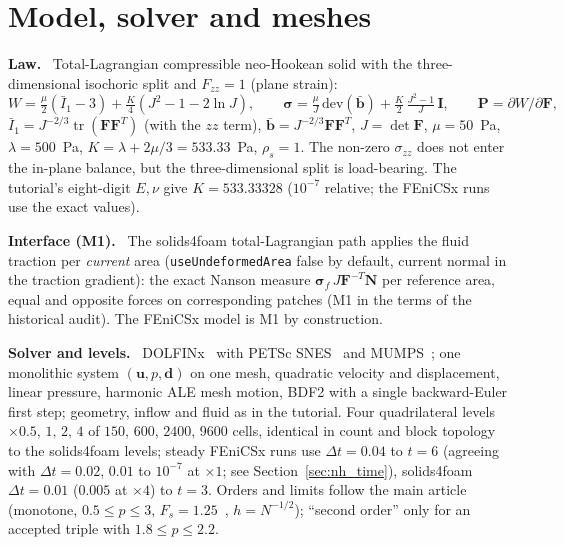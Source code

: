 \documentclass[sn-mathphys,Numbered]{sn-jnl}
\renewcommand{\paragraph}[1]{\par\vspace{0.3\baselineskip}\noindent\textbf{#1}\ }
\newcommand{\FE}{FEniCSx}
\begin{document}
\section{Model, solver and meshes}\label{sec:nh_model}
\paragraph{Law.}
Total-Lagrangian compressible neo-Hookean solid with the three-dimensional isochoric split and $F_{zz}=1$ (plane strain):
\begin{equation}
W=\tfrac{\mu}{2}(\bar I_1-3)+\tfrac{K}{4}\left(J^2-1-2\ln J\right),\qquad
\bm\sigma=\tfrac{\mu}{J}\,\mathrm{dev}(\bar{\bm b})+\tfrac{K}{2}\,\tfrac{J^2-1}{J}\,\bm I,\qquad \bm P=\partial W/\partial\bm F,
\end{equation}
$\bar I_1=J^{-2/3}\operatorname{tr}(\bm F\bm F^{T})$ (with the $zz$ term), $\bar{\bm b}=J^{-2/3}\bm F\bm F^{T}$, $J=\det\bm F$, $\mu=50$~Pa, $\lambda=500$~Pa, $K=\lambda+2\mu/3=533.33$~Pa, $\rho_s=1$. The non-zero $\sigma_{zz}$ does not enter the in-plane balance, but the three-dimensional split is load-bearing. The tutorial's eight-digit $E,\nu$ give $K=533.33328$ ($10^{-7}$ relative; the \FE{} runs use the exact values).

\paragraph{Interface (M1).}
The solids4foam total-Lagrangian path applies the fluid traction per \emph{current} area (\texttt{useUndeformedArea} false by default, current normal in the traction gradient): the exact Nanson measure $\bm\sigma_f\,J\bm F^{-T}\bm N$ per reference area, equal and opposite forces on corresponding patches (M1 in the terms of the historical audit). The \FE{} model is M1 by construction.

\paragraph{Solver and levels.}
DOLFINx~\citep{Baratta2023} with PETSc SNES~\citep{PETSc} and MUMPS~\citep{MUMPS:1,MUMPS:2}; one monolithic system $(\bm u,p,\bm d)$ on one mesh, quadratic velocity and displacement, linear pressure, harmonic ALE mesh motion, BDF2 with a single backward-Euler first step; geometry, inflow and fluid as in the tutorial. Four quadrilateral levels $\times0.5,\,1,\,2,\,4$ of $150$, $600$, $2400$, $9600$ cells, identical in count and block topology to the solids4foam levels; steady \FE{} runs use $\Delta t=0.04$ to $t=6$ (agreeing with $\Delta t=0.02$, $0.01$ to $10^{-7}$ at $\times1$; see Section~\ref{sec:nh_time}), solids4foam $\Delta t=0.01$ ($0.005$ at $\times4$) to $t=3$. Orders and limits follow the main article (monotone, $0.5\le p\le3$, $F_s=1.25$~\citep{Roache1998}, $h=N^{-1/2}$); ``second order'' only for an accepted triple with $1.8\le p\le2.2$.
\end{document}
